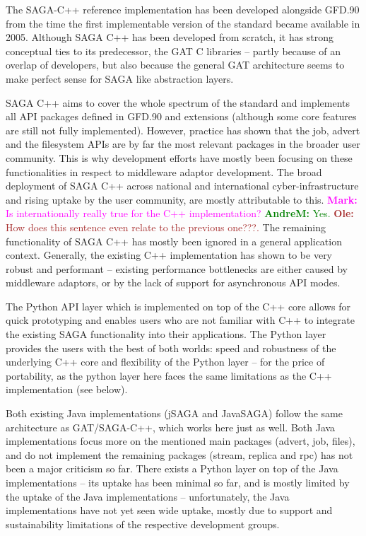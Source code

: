 \documentclass{article}
\newcommand{\B}[1]{\textbf{#1}}
\newcommand{\amnote}[1]{{\textcolor{green}{   \B{AndreM:  } #1 }}}
\newcommand{\ownote}[1]{{\textcolor{Brown}{   \B{Ole:     } #1 }}}
\newcommand{\msnote}[1]{{\textcolor{magenta}{ \B{Mark:    } #1 }}}
\newcommand{\amnote}[1]{}
\newcommand{\ownote}[1]{}
\newcommand{\msnote}[1]{}
\begin{document}
   The SAGA-C++ reference implementation has been developed alongside GFD.90
   from the time the first implementable version of the standard became
   available in 2005. Although SAGA C++ has been developed from scratch, it has
   strong conceptual ties to its predecessor, the GAT C libraries -- partly
   because of an overlap of developers, but also because the general GAT
   architecture seems to make perfect sense for SAGA like abstraction layers.

   SAGA C++ aims to cover the whole spectrum of the standard and implements all
   API packages defined in GFD.90 and extensions (although some core features
   are still not fully implemented).  However, practice has shown that the job,
   advert and the filesystem APIs are by far the most relevant packages in the
   broader user community.  This is why development efforts have mostly been
   focusing on these functionalities in respect to middleware adaptor
   development.  The broad deployment of SAGA C++ across national and
   international cyber-infrastructure and rising uptake by the user community,
   are mostly attributable to this. \msnote{Is internationally really true for
   the C++ implementation?}\amnote{Yes.} \ownote{How does this sentence even
   relate to the previous one???.} The remaining functionality of SAGA C++ has
   mostly been ignored in a general application context.  Generally, the
   existing C++ implementation has shown to be very robust and performant --
   existing performance bottlenecks are either caused by middleware adaptors, or
   by the lack of support for asynchronous API modes.  
  
   The Python API layer which is implemented on top of the C++ core allows for
   quick prototyping and enables users who are not familiar with C++ to
   integrate the existing SAGA functionality into their applications.  The
   Python layer provides the users with the best of both worlds: speed and
   robustness of the underlying C++ core and flexibility of the Python layer --
   for the price of portability, as the python layer here faces the same
   limitations as the C++ implementation (see below).

   Both existing Java implementations (jSAGA and JavaSAGA) follow the same
   architecture as GAT/SAGA-C++, which works here just as well.  Both Java
   implementations focus more on the mentioned main packages (advert, job,
   files), and do not implement the remaining packages (stream, replica and rpc)
   has not been a major criticism so far.  There exists a Python layer on top of
   the Java implementations -- its uptake has been minimal so far, and is mostly
   limited by the uptake of the Java implementations -- unfortunately, the Java
   implementations have not yet seen wide uptake, mostly due to support and
   sustainability limitations of the respective development groups.
  
\end{document}
